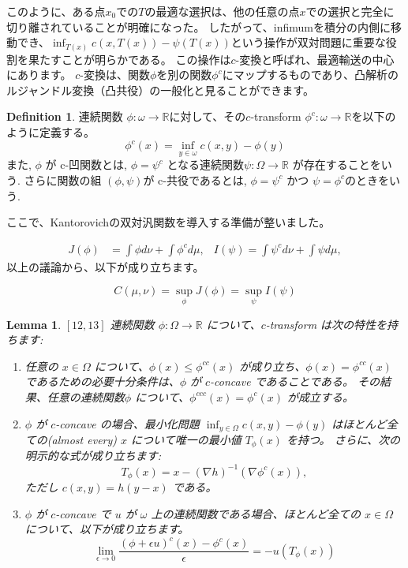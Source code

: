 \documentclass{jsarticle}
\newtheorem{lem}[thm]{Lemma}
\theoremstyle{definition}
\newtheorem{dfn}{Definition}[section]
\begin{document}
このように、ある点$x_0$での$T$の最適な選択は、他の任意の点$x$での選択と完全に切り離されていることが明確になった。
したがって、infimumを積分の内側に移動でき、$\inf_{T(x)} c(x,T(x)) - \psi (T(x))$という操作が双対問題に重要な役割を果たすことが明らかである。
この操作は$c$-変換と呼ばれ、最適輸送の中心にあります。
$c$-変換は、関数$\phi$を別の関数$\phi^c$にマップするものであり、凸解析のルジャンドル変換（凸共役）の一般化と見ることができます。

\begin{dfn}
  \label{dfn:c-transform}
  連続関数 $\phi: \omega \to \mathbb{R}$に対して、その$c$-transform $\phi^c: \omega \to \mathbb{R}$を以下のように定義する。
  \begin{equation*}
    \phi^c(x) = \inf_{y \in \omega} c(x, y) - \phi(y)
  \end{equation*}
  また, $\phi$ が c-凹関数とは, $\phi = \psi^c$ となる連続関数$\psi: \Omega \to \mathbb{R}$ が存在することをいう.
  さらに関数の組 $(\phi, \psi)$が c-共役であるとは, $\phi = \psi^c$ かつ $\psi = \phi^c$のときをいう.
\end{dfn}


ここで、Kantorovichの双対汎関数を導入する準備が整いました。

\begin{align*}
  J(\phi) &= \int \phi  d \nu + \int \phi^c  d \mu, &
  I(\psi) = \int \psi^c  d \nu + \int \psi  d \mu, 
\end{align*}
以上の議論から、以下が成り立ちます。

\begin{equation*}
  C(\mu, \nu) = \sup_\phi J(\phi) = \sup_\psi I(\psi)
\end{equation*}


\begin{lem}
  \label{lem:c-transform}
  $\left[ 12, 13 \right]$
  連続関数 $\phi: \Omega \to \mathbb{R}$ について、$c$-transform は次の特性を持ちます:
  \begin{enumerate}
  \item 任意の $x \in \Omega$ について、$\phi(x) \le \phi^{cc}(x)$ が成り立ち、$\phi(x) = \phi^{cc}(x)$ であるための必要十分条件は、$\phi$ が $c$-concave であることである。
  その結果、任意の連続関数$\phi$ について、$\phi^{ccc}(x) = \phi^{c}(x)$ が成立する。
  
  \item $\phi$ が $c$-concave の場合、最小化問題 $\inf_{y \in \Omega} c(x, y) - \phi(y)$ はほとんど全ての(almost every) $x$ について唯一の最小値 $T_\phi(x)$ を持つ。
  さらに、次の明示的な式が成り立ちます:
  \begin{equation*}
    T_\phi(x) = x - (\nabla h)^{-1}(\nabla \phi^c(x)),
  \end{equation*}
  ただし $c(x, y) = h(y - x)$ である。
  
  \item $\phi$ が $c$-concave で $u$ が $\omega$ 上の連続関数である場合、ほとんど全ての $x \in \Omega$ について、以下が成り立ちます。
  \begin{equation*}
    \lim_{\epsilon \to 0} \frac{(\phi + \epsilon u)^c(x) - \phi^c(x)}{\epsilon} = - u(T_\phi(x)) 
  \end{equation*}
  \end{enumerate}
\end{lem}
\end{document}

